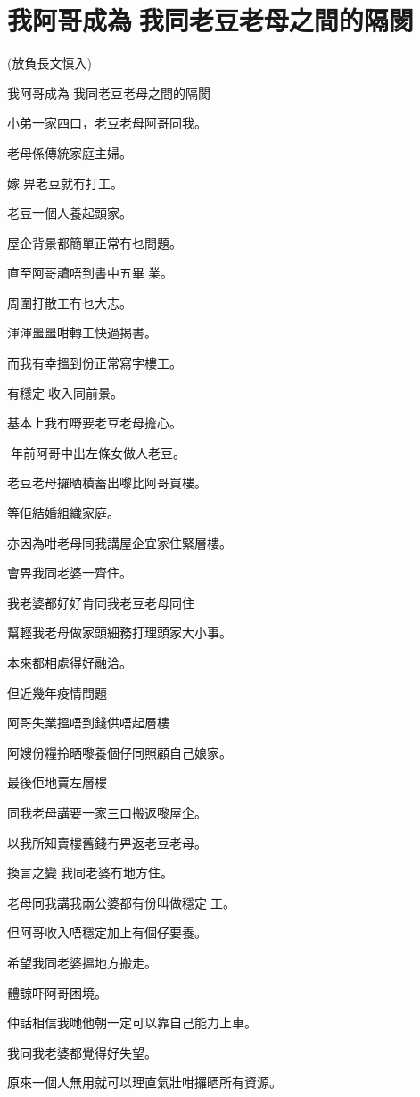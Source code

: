 \chapter{我阿哥成為󱃡我同老豆老母之間的隔閡}

(放負長文慎入) 

我阿哥成為󱃡我同老豆老母之間的隔閡

小弟一家四口，老豆老母阿哥同我。

老母係傳統家庭主婦。

嫁󱃡畀老豆就冇打工。

老豆一個人養起頭家。

屋企背景都簡單正常冇乜問題。

直至阿哥讀唔到書中五畢󱃡業。

周圍打散工冇乜大志。

渾渾噩噩咁轉工快過揭書。

而我有幸搵到份正常寫字樓工。

有穩定󱝚收入同前景。

基本上我冇嘢要老豆老母擔心。

年前阿哥中出左條女做人老豆。

老豆老母攞晒積蓄出嚟比阿哥買樓。

等佢結婚組織家庭。

亦因為咁老母同我講屋企宜家住緊層樓。

會畀我同老婆一齊住。

我老婆都好好肯同我老豆老母同住
        
幫輕我老母做家頭細務打理頭家大小事。

本來都相處得好融洽。

但近幾年疫情問題

阿哥失業搵唔到錢供唔起層樓

阿嫂份糧拎晒嚟養個仔同照顧自己娘家。

最後佢地賣左層樓

同我老母講要一家三口搬返嚟屋企。

以我所知賣樓舊錢冇畀返老豆老母。

換言之變󱃡我同老婆冇地方住。

老母同我講我兩公婆都有份叫做穩定󱝚工。

但阿哥收入唔穩定加上有個仔要養。

希望我同老婆搵地方搬走。

體諒吓阿哥困境。

仲話相信我哋他朝一定可以靠自己能力上車。

我同我老婆都覺得好失望。

原來一個人無用就可以理直氣壯咁攞晒所有資源。

